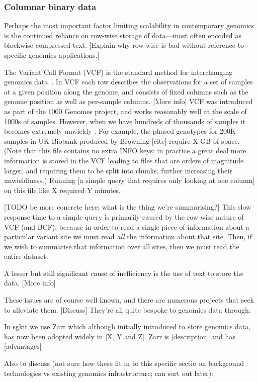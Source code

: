 \documentclass[a4paper,num-refs]{oup-contemporary}
\begin{document}
\subsubsection{Columnar binary data}

Perhaps the most important factor limiting scalability in contemporary genomics
is the continued reliance on row-wise storage of data---most often
encoded as blockwise-compressed text.
[Explain why row-wise is bad without reference to specific genomics applications.]

The Variant Call Format (VCF) is the standard method for interchanging
genomics data~\citep{danecek2011variant}.
In VCF each row describes the observations for a set of samples
at a given position along the genome, and consists of fixed columns such as the
genome position as well as per-sample columns. [More info]
VCF was introduced as part of the 1000 Genomes project, and works reasonably
well at the scale of 1000s of samples. However, when we have hundreds of
thousands of samples it becomes extremely unwieldy
. For example, the
phased genotypes for 200K samples in UK Biobank produced by Browning [cite]
require X GB of space.
(Note that this file contains no extra INFO keys; in practice a great deal
more information is stored in the VCF leading to files that are orders of
magnitude larger, and requiring them to be split into chunks, further
increasing their unwieldiness.)
Running [a simple query that requires only looking at
one column] on this file like X required Y minutes.

[TODO be more concrete here; what is the thing we're summarising?]
This slow response time to a simple query is primarily caused by the row-wise
nature of VCF (and BCF), because in order to read a single piece of
information about a particular variant site we must read \emph{all}
the information
about that site. Then, if we wish to summarise that information over
all sites, then we must read the entire dataset.

A lesser but still significant cause of inefficiency is the use of
text to store the data. [More info]

These issues are of course well known, and there are numerous projects
that seek to alleviate them. [Discuss] They're all quite bespoke to genomics data
through.

In sgkit we use Zarr which although initially introduced to store
genomics data, has now been adopted widely in [X, Y and Z].
Zarr is [description] and has [advantages]

Also to discuss (not sure how these fit in to this specific sectio
on background technologies vs existing genomics infrastructure; can
sort out later):
\end{document}
